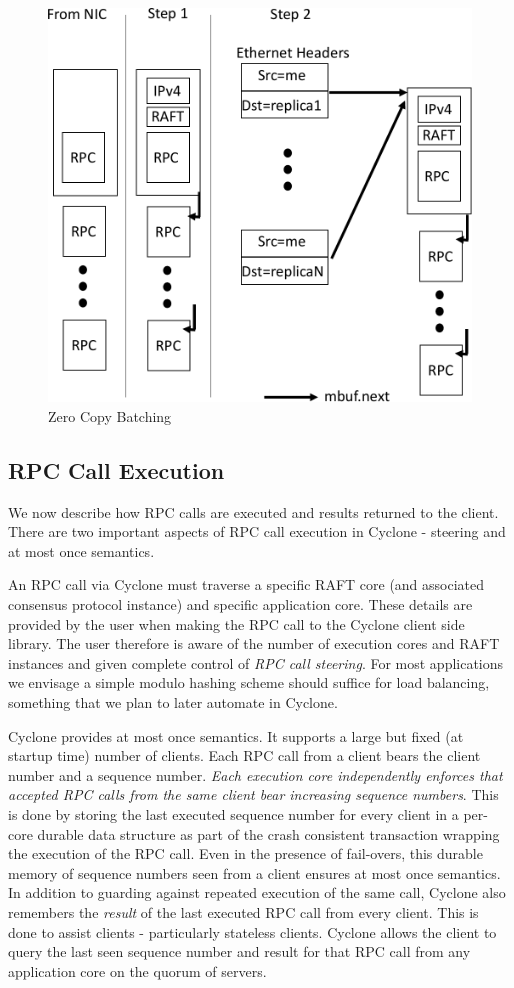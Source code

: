 \documentclass[letterpaper,twocolumn,10pt]{article}
\begin{document}
\begin{figure}
\includegraphics[width=0.9\columnwidth]{figures/chain}
\vspace{-0.15in}
\caption{Zero Copy Batching}
\label{fig:zc_batch}
\end{figure}

\subsection{RPC Call Execution}
\label{sec:exec}
We now describe how RPC calls are executed and results returned to the
client. There are two important aspects of RPC call execution in Cyclone -
steering and at most once semantics.

An RPC call via Cyclone must traverse a specific RAFT core (and associated
consensus protocol instance) and specific application core. These details are
provided by the user when making the RPC call to the Cyclone client side
library. The user therefore is aware of the number of execution cores and RAFT
instances and given complete control of \emph{RPC call steering}. For most
applications we envisage a simple modulo hashing scheme should suffice for load
balancing, something that we plan to later automate in Cyclone.

Cyclone provides at most once semantics. It supports a large but fixed (at
startup time) number of clients. Each RPC call from a client bears the client
number and a sequence number. \emph{Each execution core independently enforces
  that accepted RPC calls from the same client bear increasing sequence
  numbers}. This is done by storing the last executed sequence number for every
client in a per-core durable data structure as part of the crash consistent
transaction wrapping the execution of the RPC call. Even in the presence of
fail-overs, this durable memory of sequence numbers seen from a client ensures
at most once semantics. In addition to guarding against repeated execution of
the same call, Cyclone also remembers the \emph{result} of the last executed RPC
call from every client. This is done to assist clients - particularly stateless
clients. Cyclone allows the client to query the last seen sequence number and
result for that RPC call from any application core on the quorum of servers.
\end{document}
